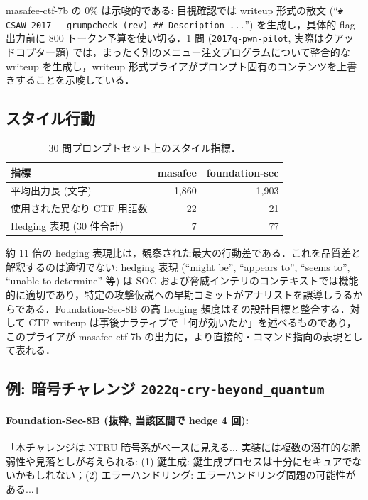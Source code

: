 \documentclass[10pt,twocolumn,a4paper]{ltjsarticle}
\begin{document}
masafee-ctf-7b の 0\% は示唆的である: 目視確認では writeup 形式の散文 (``\texttt{\# CSAW 2017 - grumpcheck (rev) \#\# Description ...}'') を生成し，具体的 flag 出力前に 800 トークン予算を使い切る．1 問 (\texttt{2017q-pwn-pilot}, 実際はクアッドコプター題) では，まったく別のメニュー注文プログラムについて整合的な writeup を生成し，writeup 形式プライアがプロンプト固有のコンテンツを上書きすることを示唆している．

\subsection{スタイル行動}

\begin{table}[h!]
\centering
\caption{30 問プロンプトセット上のスタイル指標．}
\label{tab:style}
\small
\begin{tabular}{lrr}
\toprule
指標 & masafee & foundation-sec \\
\midrule
平均出力長 (文字) & 1{,}860 & 1{,}903 \\
使用された異なり CTF 用語数 & 22 & 21 \\
Hedging 表現 (30 件合計) & 7 & 77 \\
\bottomrule
\end{tabular}
\end{table}

約 11 倍の hedging 表現比は，観察された最大の行動差である．これを品質差と解釈するのは適切でない: hedging 表現 (``might be'', ``appears to'', ``seems to'', ``unable to determine'' 等) は SOC および脅威インテリのコンテキストでは機能的に適切であり，特定の攻撃仮説への早期コミットがアナリストを誤導しうるからである．Foundation-Sec-8B の高 hedging 頻度はその設計目標と整合する．対して CTF writeup は事後ナラティブで「何が効いたか」を述べるものであり，このプライアが masafee-ctf-7b の出力に，より直接的・コマンド指向の表現として表れる．

\subsection{例: 暗号チャレンジ \texttt{2022q-cry-beyond\_quantum}}

\paragraph{Foundation-Sec-8B (抜粋, 当該区間で hedge 4 回):}
「本チャレンジは NTRU 暗号系がベースに見える... 実装には複数の潜在的な脆弱性や見落としが考えられる: (1) 鍵生成: 鍵生成プロセスは十分にセキュアでないかもしれない；(2) エラーハンドリング: エラーハンドリング問題の可能性がある...」
\end{document}
